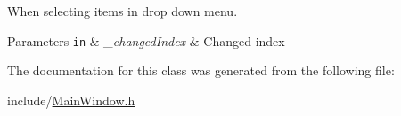 When selecting items in drop down menu. 


\begin{DoxyParams}[1]{Parameters}
\mbox{\tt in}  & {\em \+\_\+changed\+Index} & Changed index \\
\hline
\end{DoxyParams}


The documentation for this class was generated from the following file\+:\begin{DoxyCompactItemize}
\item 
include/\hyperlink{_main_window_8h}{Main\+Window.\+h}\end{DoxyCompactItemize}
